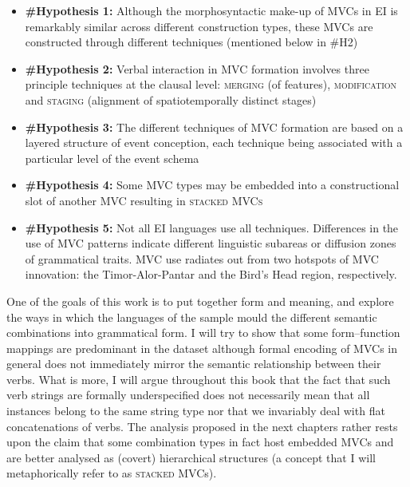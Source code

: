 \begin{footnotesize}
\begin{itemize}
\item \textbf{\#Hypothesis 1:} Although the morphosyntactic make-up of MVCs in EI is remarkably similar across different construction types, these MVCs are constructed through different techniques (mentioned below in \#H2)
\item \textbf{\#Hypothesis 2:} Verbal interaction in MVC formation involves three principle techniques at the clausal level: \textsc{merging} (of features), \textsc{modification} and \textsc{staging} (alignment of spatiotemporally distinct stages)
\item \textbf{\#Hypothesis 3:} The different techniques of MVC formation are based on a layered structure of event conception, each technique being associated with a particular level of the event schema
\item \textbf{\#Hypothesis 4:} Some MVC types may be embedded into a constructional slot of another MVC resulting in \textsc{stacked MVCs}
\item \textbf{\#Hypothesis 5:} Not all EI languages use all techniques. Differences in the use of MVC patterns indicate different linguistic subareas or diffusion zones of grammatical traits. MVC use radiates out from two hotspots of MVC innovation: the Timor-Alor-Pantar and the Bird's Head region, respectively.
\end{itemize}
\end{footnotesize}

One of the goals of this work is to put together form and meaning, and explore the ways in which the languages of the sample mould the different semantic combinations into grammatical form. I will try to show that some form--function mappings are predominant in the dataset although formal encoding of MVCs in general does not immediately mirror the semantic relationship between their verbs. What is more, I will argue throughout this book that the fact that such verb strings are formally underspecified does not necessarily mean that all instances belong to the same string type nor that we invariably deal with flat concatenations of verbs. The analysis proposed in the next chapters rather rests upon the claim that some combination types in fact host embedded MVCs and are better analysed as (covert) hierarchical structures (a concept that I will metaphorically refer to as \textsc{stacked MVC}s).


